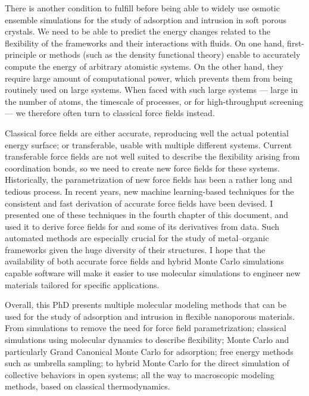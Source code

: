 There is another condition to fulfill before being able to widely use osmotic
ensemble simulations for the study of adsorption and intrusion in soft porous
crystals. We need to be able to predict the energy changes related to the
flexibility of the frameworks and their interactions with fluids. On one hand,
first-principle or \abinitio methods (such as the density functional theory)
enable to accurately compute the energy of arbitrary atomistic systems. On the
other hand, they require large amount of computational power, which prevents
them from being routinely used on large systems. When faced with such large
systems --- large in the number of atoms, the timescale of processes, or for
high-throughput screening --- we therefore often turn to classical force fields
instead.

Classical force fields are either accurate, \ie reproducing well the actual
potential energy surface; or transferable, \ie usable with multiple different
systems. Current transferable force fields are not well suited to describe the
flexibility arising from coordination bonds, so we need to create new force
fields for these systems. Historically, the parametrization of new force fields
has been a rather long and tedious process. In recent years, new machine
learning-based techniques for the consistent and fast derivation of accurate
force fields have been devised. I presented one of these techniques in the
fourth chapter of this document, and used it to derive force fields for 
and some of its derivatives from \abinitio data. Such automated methods are
especially crucial for the study of metal--organic frameworks given the huge
diversity of their structures. I hope that the availability of both accurate
force fields and hybrid Monte Carlo simulations capable software will make it
easier to use molecular simulations to engineer new materials tailored for
specific applications.

Overall, this PhD presents multiple molecular modeling methods that can be used
for the study of adsorption and intrusion in flexible nanoporous materials. From
\abinitio simulations to remove the need for force field parametrization;
classical simulations using molecular dynamics to describe flexibility; Monte
Carlo and particularly Grand Canonical Monte Carlo for adsorption; free energy
methods such as umbrella sampling; to hybrid Monte Carlo for the direct
simulation of collective behaviors in open systems; all the way to macroscopic
modeling methods, based on classical thermodynamics.

